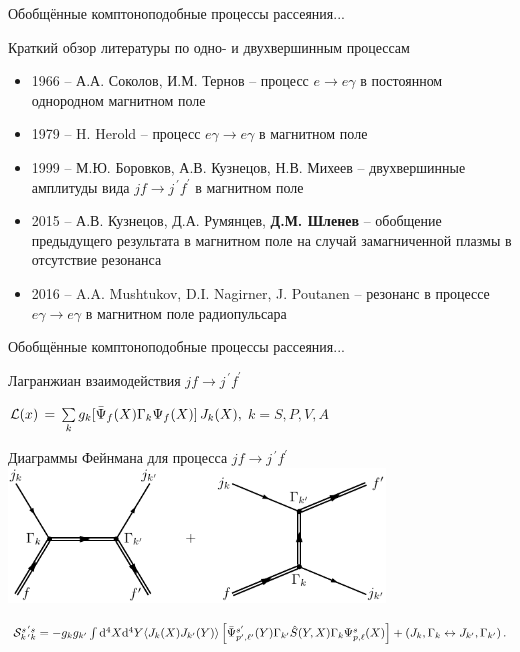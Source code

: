 \documentclass{beamer}
\newcommand{\dd}{\mathrm{d}}
\begin{document}
\begin{frame}{Обобщённые комптоноподобные процессы рассеяния...}
\begin{center}
Краткий обзор литературы по одно- и двухвершинным процессам
\end{center}

\begin{itemize}
\item 1966 -- А.А. Соколов, И.М. Тернов -- процесс $e\to e \gamma$ в постоянном однородном магнитном поле
\item 1979 -- H. Herold -- процесс $e\gamma\to e \gamma$ в магнитном поле
\item 1999 -- М.Ю. Боровков, А.В. Кузнецов, Н.В.  Михеев -- двухвершинные 
амплитуды вида $jf\to j^{\, \prime} f^{\prime}$ в магнитном поле
\item 2015 -- А.В. Кузнецов, Д.А. Румянцев, {\bf Д.М. Шленев} -- обобщение предыдущего результата 
в магнитном поле на случай замагниченной плазмы в отсутствие резонанса
\item 2016 -- A.A. Mushtukov, D.I. Nagirner, J. Poutanen -- резонанс в процессе 
$e\gamma\to e \gamma$ в магнитном поле радиопульсара
\end{itemize}
\end{frame}
\begin{frame}{Обобщённые комптоноподобные процессы рассеяния...}
\begin{center}
Лагранжиан взаимодействия $jf\to j^{\, \prime} f^{\prime}$

${\cal L}(x) \, = \, \sum \limits_{k} g_k 
[\bar {\Psi}_f (X) \Gamma_k \Psi_f(X)]\, J_k(X),$
$k=S, P, V, A$

Диаграммы Фейнмана для процесса $jf\to j^{\, \prime} f^{\prime}$
\includegraphics[width=10cm]{fig1_1-eps-converted-to.pdf}
\end{center}
${\cal S}^{s^{\, \prime} s}_{k^{\, \prime} k} = - g_k g_{k'}\int \dd^4 X \dd^4 Y \langle J_k (X) J_{k'} (Y) \rangle 
\left [\bar \Psi^{s'}_{p',\ell'}(Y) \Gamma_{k'} 
\hat S(Y,X) 
\Gamma_k \Psi^{s}_{p,\ell}(X) \right ] + (J_k, \Gamma_k \leftrightarrow J_{k'}, \Gamma_{k'})\, .$
\end{frame}
\end{document}
